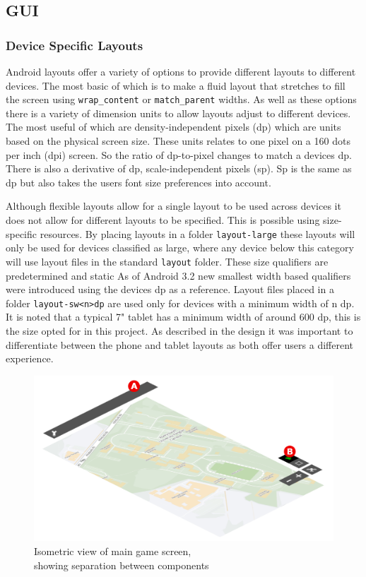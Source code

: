 \subsection{GUI}
\subsubsection*{Device Specific Layouts}
Android layouts offer a variety of options to provide different layouts to different devices. The most basic of which is to make a fluid layout that stretches to fill the screen using \verb|wrap_content| or \verb|match_parent| widths. As well as these options there is a variety of dimension units to allow layouts adjust to different devices. The most useful of which are density-independent pixels (dp) which are units based on the physical screen size. These units relates to one pixel on a 160 dots per inch (dpi) screen. So the ratio of dp-to-pixel changes to match a devices dp. There is also a derivative of dp, scale-independent pixels (sp). Sp is the same as dp but also takes the users font size preferences into account.

Although flexible layouts allow for a single layout to be used across devices it does not allow for different layouts to be specified. This is possible using size-specific resources\cite{screensizes}. By placing layouts in a folder \verb|layout-large| these layouts will only be used for devices classified as large, where any device below this category will use layout files in the standard \verb|layout| folder. These size qualifiers are predetermined and static As of Android 3.2 new smallest width based qualifiers were introduced using the devices dp as a reference. Layout files placed in a folder \verb|layout-sw<n>dp| are used only for devices with a minimum width of n dp. It is noted that a typical 7" tablet has a minimum width of around 600 dp, this is the size opted for in this project. As described in the design it was important to differentiate between the phone and tablet layouts as both offer users a different experience.

\begin{figure}[H]
  \centering
   \includegraphics[width=1\textwidth]{Images/layout_include.png}
  \caption{Isometric view of main game screen,\\showing separation between components}
  \label{fig:isogui}
\end{figure}

